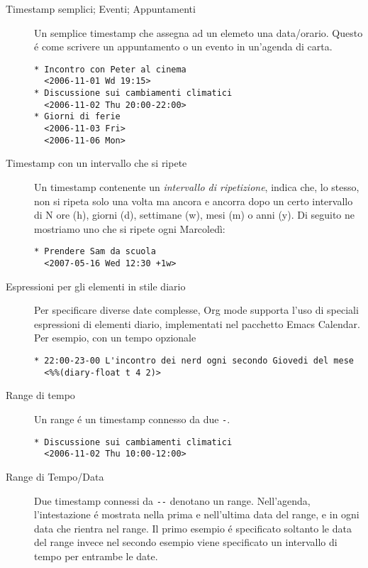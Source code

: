 \documentclass[11pt]{article}
\begin{document}
\begin{description}
\item[{Timestamp semplici; Eventi; Appuntamenti}] Un semplice timestamp che assegna ad un elemeto una
data/orario. Questo é come scrivere un appuntamento o un evento in
un'agenda di carta.

\begin{verbatim}
* Incontro con Peter al cinema
  <2006-11-01 Wd 19:15>
* Discussione sui cambiamenti climatici
  <2006-11-02 Thu 20:00-22:00>
* Giorni di ferie
  <2006-11-03 Fri>
  <2006-11-06 Mon>
\end{verbatim}

\item[{Timestamp con un intervallo che si ripete}] Un timestamp contenente un \emph{intervallo di ripetizione}, indica
che, lo stesso, non si ripeta solo una volta ma ancora e ancorra
dopo un certo intervallo di N ore (h), giorni (d), settimane (w),
mesi (m) o anni (y). Di seguito ne mostriamo uno che si ripete ogni
Marcoledì:

\begin{verbatim}
* Prendere Sam da scuola
  <2007-05-16 Wed 12:30 +1w>
\end{verbatim}

\item[{Espressioni per gli elementi in stile diario}] Per specificare diverse date complesse, Org mode supporta l'uso di
speciali espressioni di elementi diario, implementati nel pacchetto
Emacs Calendar. Per esempio, con un tempo opzionale

\begin{verbatim}
* 22:00-23-00 L'incontro dei nerd ogni secondo Giovedi del mese
  <%%(diary-float t 4 2)>
\end{verbatim}

\item[{Range di tempo}] Un range é un timestamp connesso da due \texttt{-}.

\begin{verbatim}
* Discussione sui cambiamenti climatici
  <2006-11-02 Thu 10:00-12:00>
\end{verbatim}

\item[{Range di Tempo/Data}] Due timestamp connessi da \texttt{-{}-{}} denotano un range. Nell'agenda,
l'intestazione é mostrata nella prima e nell'ultima data del range,
e in ogni data che rientra nel range. Il primo esempio é specificato
soltanto le data del range invece nel secondo esempio viene
specificato un intervallo di tempo per entrambe le date.


\end{description}
\end{document}
